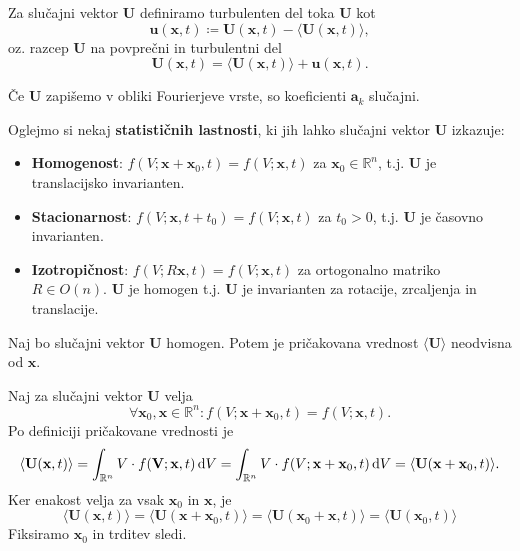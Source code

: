\documentclass[mat2, tisk]{fmfdelo}
\newcommand{\R}{\mathbb R}
\newcommand{\bd}{\textbf}
\begin{document}
\begin{definicija}
Za slučajni vektor $\bd{U}$ definiramo turbulenten del toka $\bd{U}$ kot
\begin{equation*}
\bd{u}(\bd{x}, t) \coloneqq \bd{U}(\bd{x}, t) -  \langle \bd{U}(\bd{x}, t) \rangle,
\end{equation*}
oz. razcep $\bd{U}$ na povprečni in turbulentni del
\begin{equation}
\label{Reynoldsov razcep}
\bd{U}(\bd{x}, t) = \langle \bd{U}(\bd{x}, t) \rangle + \bd{u}(\bd{x}, t).
\end{equation}
\end{definicija}
Če $\bd{U}$ zapišemo v obliki Fourierjeve vrste, so koeficienti $\bd{a}_k$ slučajni.

Oglejmo si nekaj \textbf{statističnih lastnosti}, ki jih lahko slučajni
vektor $\bd{U}$ izkazuje:
\begin{itemize}
  \item \textbf{Homogenost}: $f(V; \bd{x} + \bd{x}_0, t) = f(V; \bd{x}, t)$ za $\bd{x}_0 \in \R^n$, t.j. $\bd{U}$ je 
  translacijsko invarianten.
  \item \textbf{Stacionarnost}: $f(V; \bd{x}, t + t_0) = f(V; \bd{x}, t)$ za $t_0>0$, t.j. $\bd{U}$ je 
  časovno invarianten. 
  \item \textbf{Izotropičnost}: $f(V; R\bd{x}, t) = f(V; \bd{x}, t)$ za ortogonalno matriko $R\in O(n)$. $\bd{U}$ je homogen t.j. $\bd{U}$ je 
  invarianten za rotacije, zrcaljenja in translacije. 
\end{itemize} 

\begin{lema}
\label{homogenost}
Naj bo slučajni vektor $\bd{U}$ homogen. Potem je pričakovana 
vrednost $\langle \bd{U} \rangle$ neodvisna od $\bd{x}$. 
\end{lema}

\begin{dokaz}
Naj za slučajni vektor $\bd{U}$ velja
$$\forall \bd{x}_0, \bd{x} \in \R^n: f(V; \bd{x} + \bd{x}_0, t) = f({V}; \bd{x}, t).$$
Po definiciji pričakovane vrednosti je
$$
\langle \bd{U}(\bd{x}, t) \rangle = \int_{\R^n} {V} \cdot f(\bd{V}; \bd{x}, t) \dif {V} = \int_{\R^n} {V} \cdot f({V}; \bd{x} + \bd{x}_0, t) \dif {V} = \langle \bd{U}(\bd{x} + \bd{x}_0, t) \rangle.
$$
Ker enakost velja za vsak $\bd{x}_0$ in $\bd{x}$, je
$$
\langle \bd{U}(\bd{x}, t) \rangle = \langle \bd{U}(\bd{x} + \bd{x}_0, t) \rangle = \langle \bd{U}(\bd{x}_0 + \bd{x}, t) \rangle = \langle \bd{U}(\bd{x}_0, t) \rangle
$$
Fiksiramo $\bd{x}_0$ in trditev sledi.
\end{dokaz}
\end{document}
